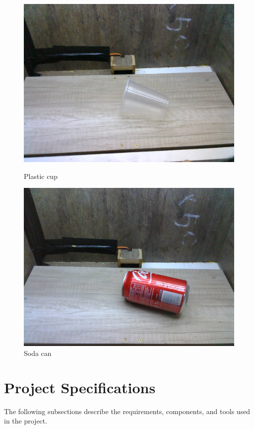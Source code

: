 \documentclass[a4paper,11pt]{article}
\begin{document}
\begin{figure}[H]
  \centering
  \begin{minipage}{.5\textwidth}
    \centering
    \includegraphics[width=.8\linewidth]{Figures/Classificiations/plasticCup.png}
    \caption{\small{Plastic cup}}
    \label{fig:plasticcup}
  \end{minipage}%
  \begin{minipage}{.5\textwidth}
    \centering
    \includegraphics[width=.8\linewidth]{Figures/Classificiations/sodaCan.png}
    \caption{\small{Soda can}}
    \label{fig:soda}
  \end{minipage}
\end{figure}



\section{Project Specifications}
\label{sec:specification}
\noindent

The following subsections describe the requirements, components, and tools used in the project.
\end{document}

